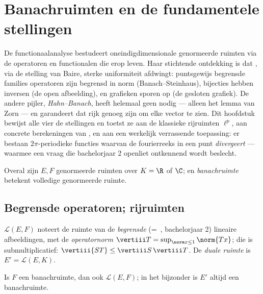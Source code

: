 \chapter{Banachruimten en de fundamentele stellingen}
\label{ch:b3:banach}

De functionaalanalyse bestudeert oneindigdimensionale genormeerde
ruimten via de operatoren en functionalen die erop leven. Haar
stichtende ontdekking is dat \emph{}, via de stelling
van Baire, sterke uniformiteit afdwingt: puntsgewijs begrensde
families operatoren zijn begrensd in norm (Banach--Steinhaus),
 bijecties hebben  inversen (de open afbeelding),
en grafieken sporen  op (de gesloten grafiek). De
andere pijler, \emph{Hahn--Banach}, heeft helemaal geen
 nodig --- alleen het lemma van Zorn --- en
garandeert dat  rijk genoeg zijn om elke vector te
zien. Dit hoofdstuk bewijst alle vier de stellingen en toetst ze
aan de klassieke rijruimten $\ell^p$, aan concrete berekeningen
van , en aan een werkelijk verrassende toepassing: er
bestaan  $2\pi$-periodieke functies waarvan de fourierreeks
in een punt \emph{divergeert} --- waarmee een vraag die
bachelorjaar 2 openliet ontkennend wordt beslecht.

Overal zijn $E, F$ genormeerde ruimten over $K = \R$ of $\C$; en
\emph{banachruimte} betekent volledige
genormeerde ruimte.

\section{Begrensde operatoren; rijruimten}

\begin{definition}\label{def:b3:banach:operator}
$\mathcal L(E, F)$ noteert de ruimte van de \emph{begrensde}
(=\ , bachelorjaar 2) lineaire afbeeldingen, met de
\emph{operatornorm} $\vertiii T = \sup_{\norm
x \leq 1}\norm{Tx}$; die is submultiplicatief: $\vertiii{ST} \leq
\vertiii S\,\vertiii T$. De \emph{duale ruimte} is $E' = \mathcal L(E, K)$.
\end{definition}

\begin{proposition}\label{prop:b3:banach:llcomplete}
Is $F$ een banachruimte, dan ook $\mathcal L(E, F)$; in het
bijzonder is $E'$ altijd een banachruimte.
\end{proposition}

